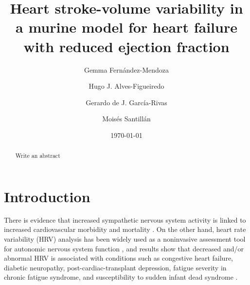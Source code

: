 \documentclass[%
preprint,
 amsmath,amssymb,
 aps,
]{revtex4-2}
\begin{document}
\preprint{}

\title{Heart stroke-volume variability in a murine model for heart failure with reduced ejection fraction}%

\author{Gemma Fernández-Mendoza}
%

\author{Hugo J. Alves-Figueiredo}

\author{Gerardo de J. García-Rivas}

%

\author{Moisés Santillán}
%

\date{\today}%

\begin{abstract}
Write an abstract
\end{abstract}

\maketitle


\section{\label{sec:intro}Introduction}

There is evidence that increased sympathetic nervous system activity is linked to increased cardiovascular morbidity and mortality \citep{Malpas_2010}. On the other hand, heart rate variability (HRV) analysis has been widely used as a noninvasive assessment tool for autonomic nervous system function \citep{Kiyono_2016}, and results show that decreased and/or abnormal HRV is associated with conditions such as congestive heart failure, diabetic neuropathy, post-cardiac-transplant depression, fatigue severity in chronic fatigue syndrome, and susceptibility to sudden infant dead syndrome \citep{Kamen_1995, Rajendra_Acharya_2006, Zeki_Al_Hazzouri_2014, Escorihuela_2020}. 
\end{document}
